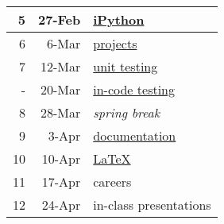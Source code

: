 \documentclass[12pt]{article}
\begin{document}
\begin{table}[htbp]
\begin{tabular}{|r|r|l|}
5  & 27-Feb & \href{https://github.com/rachelslaybaugh/ucb-ipython-intro}{iPython} \\ \hline
6  & 6-Mar & \href{https://github.com/rachelslaybaugh/NE24/blob/master/project.md}{projects} \\ \hline%
7  & 12-Mar &  \href{http://rachelslaybaugh.github.io/python-testing/}{unit testing} \\ \hline
-  & 20-Mar & \href{http://rachelslaybaugh.github.io/python-testing/}{in-code testing}\\ \hline
8  & 28-Mar & \textit{spring break} \\ \hline
9  & 3-Apr  & \href{https://github.com/rachelslaybaugh/NE24/tree/gh-pages/documentation/documentation.ipynb}{documentation} \\ \hline
10 & 10-Apr & \href{https://github.com/garretchristensen/LaTeXIntro}{\LaTeX} \\ \hline
11 & 17-Apr & careers \\ \hline
12 & 24-Apr & in-class presentations \\ \hline
\end{tabular}
\end{table}
\end{document}
